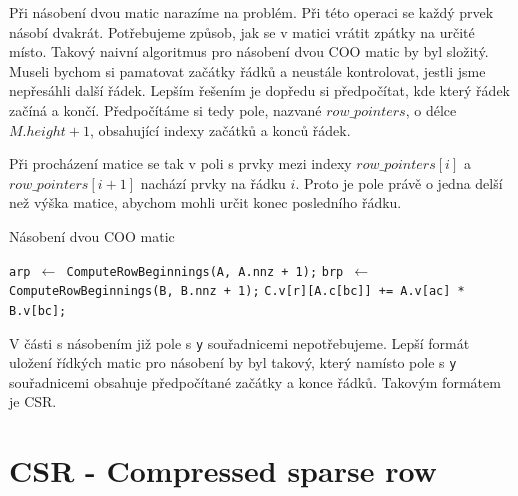 \label{alg:coo-mmm}
Při násobení dvou matic narazíme na problém. Při této operaci se každý prvek násobí dvakrát. Potřebujeme způsob, jak se v matici vrátit zpátky na určité místo. Takový naivní algoritmus pro násobení dvou COO matic by byl složitý. Museli bychom si pamatovat začátky řádků a neustále kontrolovat, jestli jsme nepřesáhli další řádek. Lepším řešením je dopředu si předpočítat, kde který řádek začíná a končí. Předpočítáme si tedy pole, nazvané $row\_pointers$, o délce $M.height + 1$, obsahující indexy začátků a konců řádek.

Při procházení matice se tak v poli s prvky mezi indexy $row\_pointers[i]$ a $row\_pointers[i+1]$ nachází prvky na řádku $i$. Proto je pole právě o jedna delší než výška matice, abychom mohli určit konec posledního řádku.

\begin{algorithm}[htb]
	\caption{Násobení dvou COO matic}\label{coo-mmm}
	\begin{algorithmic}[1]
		\State \texttt{arp $\gets$ ComputeRowBeginnings(A, A.nnz + 1);}
		\State \texttt{brp $\gets$ ComputeRowBeginnings(B, B.nnz + 1);}
					\State \texttt{C.v[r][A.c[bc]] += A.v[ac] * B.v[bc];}
				\EndFor
			\EndFor
		\EndFor
		\EndProcedure
	\end{algorithmic}
\end{algorithm}

V části s násobením již pole s \texttt{y} souřadnicemi nepotřebujeme. Lepší formát uložení řídkých matic pro násobení by byl takový, který namísto pole s \texttt{y} souřadnicemi obsahuje předpočítané začátky a konce řádků. Takovým formátem je CSR.


\section{CSR - Compressed sparse row}

